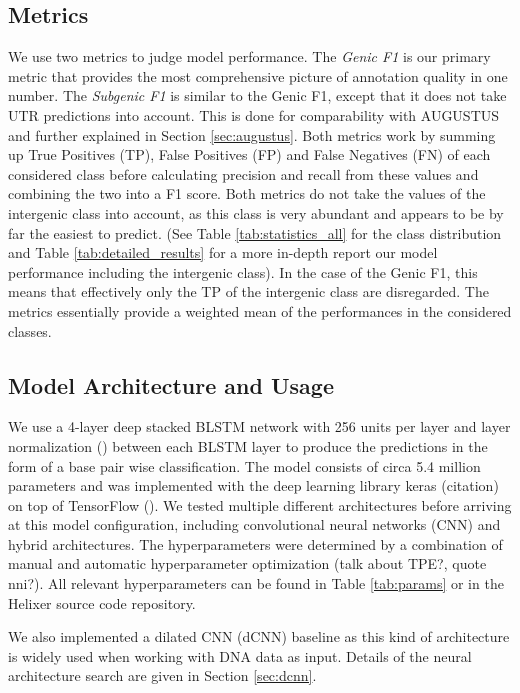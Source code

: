 \documentclass{bioinfo}
\begin{document}
\begin{methods}
\subsection{Metrics}
We use two metrics to judge model performance. The {\it Genic F1} is our primary metric that provides the most comprehensive picture of annotation quality in one number. The {\it Subgenic F1} is similar to the Genic F1, except that it does not take UTR predictions into account. This is done for comparability with AUGUSTUS and further explained in Section \ref{sec:augustus}. Both metrics work by summing up True Positives (TP), False Positives (FP) and False Negatives (FN) of each considered class before calculating precision and recall from these values and combining the two into a F1 score. Both metrics do not take the values of the intergenic class into account, as this class is very abundant and appears to be by far the easiest to predict. (See Table \ref{tab:statistics_all} for the class distribution and Table \ref{tab:detailed_results} for a more in-depth report our model performance including the intergenic class). In the case of the Genic F1, this means that effectively only the TP of the intergenic class are disregarded. The metrics essentially provide a weighted mean of the performances in the considered classes. 

	
\subsection{Model Architecture and Usage}
\label{sec:model}
We use a 4-layer deep stacked BLSTM network with 256 units per layer and layer normalization (\citealp{Layernorm}) between each BLSTM layer to produce the predictions in the form of a base pair wise classification. The model consists of circa 5.4 million parameters and was implemented with the deep learning library keras (citation) on top of TensorFlow (\citealp{Tensorflow}). We tested multiple different architectures before arriving at this model configuration, including convolutional neural networks (CNN) and hybrid architectures. The hyperparameters were determined by a combination of manual and automatic hyperparameter optimization (talk about TPE?, quote nni?). All relevant hyperparameters can be found in Table \ref{tab:params} or in the Helixer source code repository. 

We also implemented a dilated CNN (dCNN) baseline as this kind of architecture is widely used when working with DNA data as input. Details of the neural architecture search are given in Section \ref{sec:dcnn}.
	

\end{methods}
\end{document}

